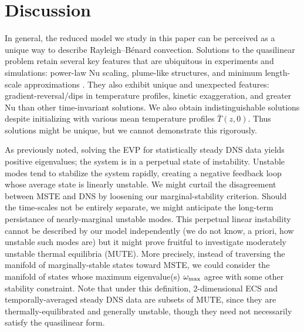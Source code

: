 \documentclass[reprint,amsmath,amssymb,aps]{revtex4-1}
\newcommand\Nu{\mathrm{Nu}}
\begin{document}
\section{Discussion}\label{sec:Discussion}
In general, the reduced model we study in this paper can be perceived as a unique way to describe Rayleigh–Bénard convection. 
Solutions to the quasilinear problem retain several key features that are ubiquitous in experiments and simulations: power-law $\Nu$ scaling, plume-like structures, and minimum length-scale approximations \cite{Malkus_1954}. 
They also exhibit unique and unexpected features: gradient-reversal/dips in temperature profiles, kinetic exaggeration, and greater $\Nu$ than other time-invariant solutions. 
We also obtain indistinguishable solutions despite initializing with various mean temperature profiles $\bar{T}(z, 0)$. 
Thus solutions might be unique, but we cannot demonstrate this rigorously.

As previously noted, solving the EVP for statistically steady DNS data yields positive eigenvalues; the system is in a perpetual state of instability. 
Unstable modes tend to stabilize the system rapidly, creating a negative feedback loop whose average state is linearly unstable. 
We might curtail the disagreement between MSTE and DNS by loosening our marginal-stability criterion. 
Should the time-scales not be entirely separate, we might anticipate the long-term persistance of nearly-marginal unstable modes. 
This perpetual linear instability cannot be described by our model independently (we do not know, a priori, how unstable such modes are) but it might prove fruitful to investigate moderately unstable thermal equilibria (MUTE). 
More precisely, instead of traversing the manifold of marginally-stable states toward MSTE, we could consider the manifold of states whose maximum eigenvalue(s) $\omega_{\rm{max}}$ agree with some other stability constraint. 
Note that under this definition, 2-dimensional ECS and temporally-averaged steady DNS data are subsets of MUTE, since they are thermally-equilibrated and generally unstable, though they need not necessarily satisfy the quasilinear form.
\end{document}
